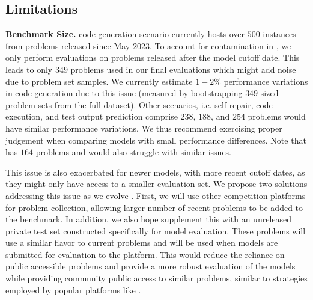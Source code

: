 \subsection{Limitations}
\label{app:sec:limitations}
\noindent \textbf{Benchmark Size.}
\livecodebench{} code generation scenario currently hosts over $500$ instances from problems released since May $2023$.
To account for contamination in \deepseek{}, we only perform evaluations on problems released after the model cutoff date.
This leads to only $349$ problems used in our final evaluations which might add noise due to problem set samples.
We currently estimate $1-2\%$ performance variations in \lcb{} code generation due to this issue (measured by bootstrapping $349$ sized problem sets from the full dataset).
Other scenarios, i.e. self-repair, code execution, and test output prediction comprise $238$, $188$, and $254$ problems would have similar performance variations. 
We thus recommend exercising proper judgement when comparing models with small performance differences.
Note that \humaneval{} has $164$ problems and would also struggle with similar issues.

This issue is also exacerbated for newer models, with more recent cutoff dates, as they might only have access to a smaller evaluation set.
We propose two solutions addressing this issue as we evolve \livecodebench{}.
First, we will use other competition platforms for problem collection, allowing larger number of recent problems to be added to the benchmark.
In addition, we also hope supplement this with an unreleased private test set constructed specifically for model evaluation. 
These problems will use a similar flavor to current problems and will be used when models are submitted for evaluation to the \livecodebench{} platform.
This would reduce the reliance on public accessible problems and provide a more robust evaluation of the models while providing community public access to similar problems, similar to strategies employed by popular platforms like .

